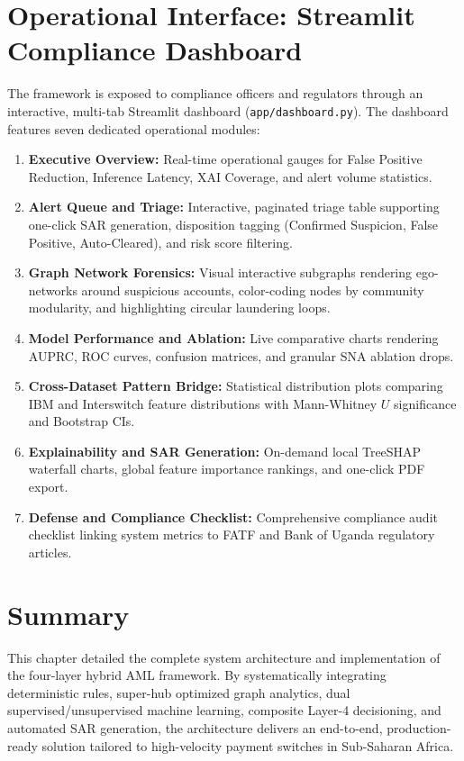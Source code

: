 \section{Operational Interface: Streamlit Compliance Dashboard}
The framework is exposed to compliance officers and regulators through an interactive, multi-tab Streamlit dashboard (\texttt{app/dashboard.py}). The dashboard features seven dedicated operational modules:
\begin{enumerate}
    \item \textbf{Executive Overview:} Real-time operational gauges for False Positive Reduction, Inference Latency, XAI Coverage, and alert volume statistics.
    \item \textbf{Alert Queue and Triage:} Interactive, paginated triage table supporting one-click SAR generation, disposition tagging (Confirmed Suspicion, False Positive, Auto-Cleared), and risk score filtering.
    \item \textbf{Graph Network Forensics:} Visual interactive subgraphs rendering ego-networks around suspicious accounts, color-coding nodes by community modularity, and highlighting circular laundering loops.
    \item \textbf{Model Performance and Ablation:} Live comparative charts rendering AUPRC, ROC curves, confusion matrices, and granular SNA ablation drops.
    \item \textbf{Cross-Dataset Pattern Bridge:} Statistical distribution plots comparing IBM and Interswitch feature distributions with Mann-Whitney $U$ significance and Bootstrap CIs.
    \item \textbf{Explainability and SAR Generation:} On-demand local TreeSHAP waterfall charts, global feature importance rankings, and one-click PDF export.
    \item \textbf{Defense and Compliance Checklist:} Comprehensive compliance audit checklist linking system metrics to FATF and Bank of Uganda regulatory articles.
\end{enumerate}

\section{Summary}
This chapter detailed the complete system architecture and implementation of the four-layer hybrid AML framework. By systematically integrating deterministic rules, super-hub optimized graph analytics, dual supervised/unsupervised machine learning, composite Layer-4 decisioning, and automated SAR generation, the architecture delivers an end-to-end, production-ready solution tailored to high-velocity payment switches in Sub-Saharan Africa.

